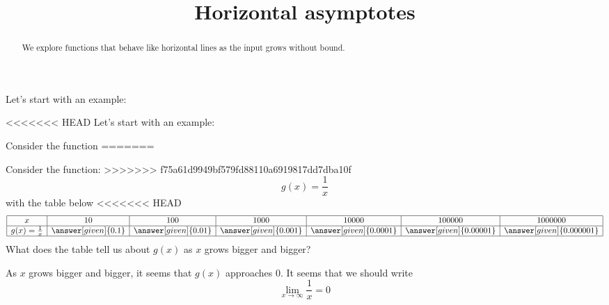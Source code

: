 \documentclass{ximera}
\title[Dig-In:]{Horizontal asymptotes}
\begin{document}
\begin{abstract}
We explore functions that behave like horizontal lines as the input
grows without bound.
\end{abstract}
\maketitle

Let's start with an example:

<<<<<<< HEAD
Let's start with an example:
\begin{example}
Consider the function
=======
\begin{example}
Consider the function:
>>>>>>> f75a61d9949bf579fd88110a6919817dd7dba10f
\[
g(x) = \frac{1}{x}
\]
with the table below
<<<<<<< HEAD
\[
\begin{array}{|c|c|c|c|c|c|c|}\hline
  x & 10 & 100 & 1000 & 10000 & 100000 & 1000000  \\\hline
  g(x)=\frac{1}{x} & \answer[given]{0.1} & \answer[given]{0.01} & \answer[given]{0.001} & \answer[given]{0.0001} & \answer[given]{0.00001} & \answer[given]{0.000001} \\
  \hline
\end{array}
\]
What does the table tell us about $g(x)$ as $x$ grows bigger and bigger?
\begin{explanation}
  As $x$ grows bigger and bigger, it seems that $g(x)$ approaches $0$. It seems that we should write
  \[
  \lim_{x\to \infty}\frac{1}{x}=0 
  \]
\end{explanation}
\end{example}


\end{example}
\end{document}
